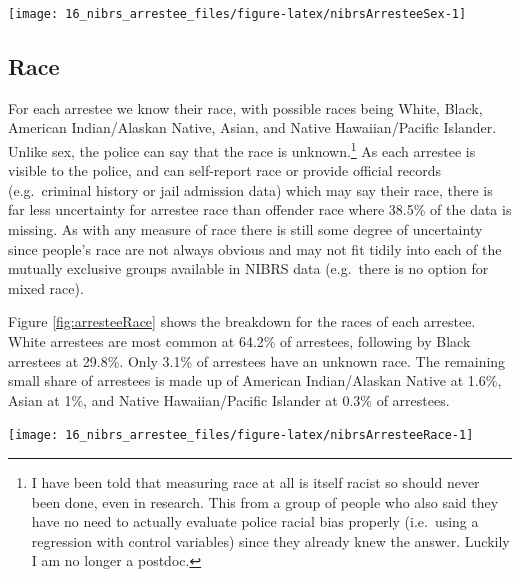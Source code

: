 \documentclass[
]{krantz}
\let\origfigure\figure
\let\endorigfigure\endfigure
\renewenvironment{figure}[1][2] {
    \expandafter\origfigure\expandafter[H]
} {
    \endorigfigure
}
\begin{document}
\begin{figure}

{\centering \texttt{[image: 16\_nibrs\_arrestee\_files/figure-latex/nibrsArresteeSex-1]} 

}

\caption{The share of arrestees by sex, 1991-2022.}\label{fig:nibrsArresteeSex}
\end{figure}

\subsection{Race}\label{race-4}

For each arrestee we know their race, with possible races
being White, Black, American Indian/Alaskan Native, Asian,
and Native Hawaiian/Pacific Islander. Unlike sex, the police
can say that the race is unknown.\footnote{I have been told
  that measuring race at all is itself racist so should
  never been done, even in research. This from a group of
  people who also said they have no need to actually
  evaluate police racial bias properly (i.e.~using a
  regression with control variables) since they already knew
  the answer. Luckily I am no longer a postdoc.} As each
arrestee is visible to the police, and can self-report race
or provide official records (e.g.~criminal history or jail
admission data) which may say their race, there is far less
uncertainty for arrestee race than offender race where
38.5\% of the data is missing. As with any measure of race
there is still some degree of uncertainty since people's
race are not always obvious and may not fit tidily into each
of the mutually exclusive groups available in NIBRS data
(e.g.~there is no option for mixed race).

Figure \ref{fig:arresteeRace} shows the breakdown for the
races of each arrestee. White arrestees are most common at
64.2\% of arrestees, following by Black arrestees at 29.8\%.
Only 3.1\% of arrestees have an unknown race. The remaining
small share of arrestees is made up of American
Indian/Alaskan Native at 1.6\%, Asian at 1\%, and Native
Hawaiian/Pacific Islander at 0.3\% of arrestees.

\begin{figure}

{\centering \texttt{[image: 16\_nibrs\_arrestee\_files/figure-latex/nibrsArresteeRace-1]} 

}

\caption{The share of arrestees by race, 1991-2022.}\label{fig:nibrsArresteeRace}
\end{figure}
\end{document}
